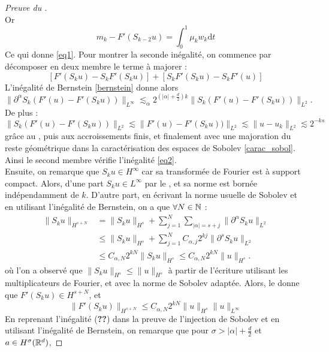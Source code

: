 \documentclass[11pt,a4paper]{article}
\begin{document}
\begin{proof}[Preuve du ]
\begin{equation*}
\end{equation*}
Or 
\begin{equation*}
m_k - F'(S_{k-2}u) = \int_0^1 \mu_k w_k\mathrm{d}t
\end{equation*}
Ce qui donne \eqref{eq1}.
Pour montrer la seconde inégalité, on commence par décomposer en deux membre le terme à majorer :
\begin{equation*}
\left[ F'(S_{k}u) - S_k F'(S_{k}u) \right] + \left[ S_k F'(S_{k}u) - S_kF'(u) \right]
\end{equation*}
L'inégalité de Bernstein \eqref{bernstein} donne alors 
\begin{equation*}
\|\partial^\alpha S_k (F'(u) - F'(S_ku) )\|_{L^\infty} \lesssim_\alpha 2^{(|\alpha| + \frac{d}{2})k } \|S_k (F'(u) - F'(S_ku) )\|_{L^2}.
\end{equation*}
De plus :
\begin{equation*}
\|S_k (F'(u) - F'(S_ku) )\|_{L^2} \lesssim \|F'(u) - F'(S_ku) )\|_{L^2} \lesssim \|u-u_k\|_{L^2} \lesssim 2^{-ks}
\end{equation*}
grâce au , puis aux accroissements finis, et finalement avec une majoration du reste géométrique dans la caractérisation des espaces de Sobolev \eqref{carac_sobol}. Ainsi le second membre vérifie l'inégalité \eqref{eq2}. \\
Ensuite, on remarque que $S_ku \in H^\infty$ car sa transformée de Fourier est à support compact. Alors, d'une part $S_ku \in L^\infty	$ par le , et sa norme est bornée indépendamment de $k$. D'autre part, en écrivant la norme usuelle de Sobolev et en utilisant l'inégalité de Bernstein, on a que $\forall N \in \mathbb N$ :
\begin{align*}
 \|S_ku\|_{H^{s+N}} &= \|S_ku\|_{H^s} + \sum_{j=1}^N\sum_{|\alpha|=s+j} \|\partial^\alpha S_k u \|_{L^2} \\
& \leq \|S_ku\|_{H^s} + \sum_{j=1}^N C_{\alpha,j} 2^{kj} \|\partial^s S_ku\|_{L^2} \\
& \leq C_{\alpha,N} 2^{kN}\|S_ku\|_{H^s} \leq C_{\alpha,N} 2^{kN}\|u\|_{H^s} .
\end{align*}
où l'on a observé que $\|S_ku\|_{H^s} \leq \|u\|_{H^s}$ à partir de l'écriture utilisant les multiplicateurs de Fourier, et avec la norme de Sobolev adaptée. Alors, le  donne que $F'(S_ku)\in H^{s+N}$, et 
\begin{equation}\label{utillem}
\|F'(S_ku)\|_{H^{s+N}} \leq C_{\alpha,N}2^{kN}\|u\|_{H^s}\|u\|_{L^\infty}
\end{equation}
En reprenant l'inégalité (\textbf{??}) dans la preuve de l'injection de Sobolev et en utilisant l'inégalité de Bernstein, on remarque que pour $\sigma > |\alpha| + \frac{d}{2}$ et $a\in H^\sigma(\mathbb R^d)$,

\end{proof}
\end{document}
